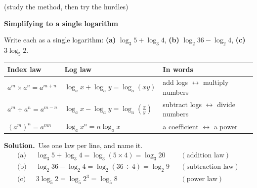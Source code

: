 \documentclass[11pt]{article}
\begin{document}
\;\textcolor{inksoft}{\small(study the method, then try the hurdles)}\par

\begin{workedbox}

{\bfseries\color{chalkdk}Simplifying to a single logarithm}\par\vspace{3pt}

Write each as a single logarithm: \textbf{(a)} $\log_3 5+\log_3 4$, \textbf{(b)} $\log_2 36-\log_2 4$, \textbf{(c)} $3\log_5 2$.\par\vspace{2pt}

\begin{center}\renewcommand{\arraystretch}{1.3}\begin{tabular}{l@{\qquad}l@{\qquad}l}
\textcolor{inksoft}{\small Index law} & \textcolor{inksoft}{\small Log law} & \textcolor{inksoft}{\small In words}\\\hline
$a^m\times a^n=a^{m+n}$ & $\log_a x+\log_a y=\log_a(xy)$ & add logs $\leftrightarrow$ multiply numbers\\
$a^m\div a^n=a^{m-n}$ & $\log_a x-\log_a y=\log_a\!\left(\tfrac{x}{y}\right)$ & subtract logs $\leftrightarrow$ divide numbers\\
$(a^m)^n=a^{mn}$ & $\log_a x^n=n\log_a x$ & a coefficient $\leftrightarrow$ a power
\end{tabular}\end{center}

{\bfseries Solution.}\ Use one law per line, and name it. \begin{align*} \text{(a)}\;\;&\log_3 5+\log_3 4=\log_3(5\times4)=\log_3 20 &&(\text{addition law})\\ \text{(b)}\;\;&\log_2 36-\log_2 4=\log_2(36\div4)=\log_2 9 &&(\text{subtraction law})\\ \text{(c)}\;\;&3\log_5 2=\log_5 2^3=\log_5 8 &&(\text{power law}) \end{align*}

\end{workedbox}
\end{document}
